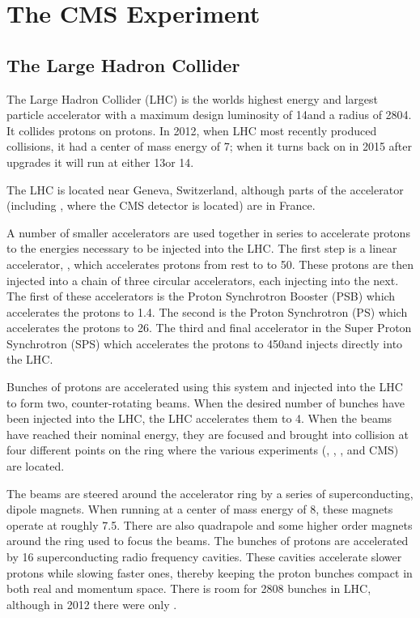 
\chapter{The CMS Experiment}
\label{experiment_chapter}

\section{The Large Hadron Collider}
\label{lhc_section}

The Large Hadron Collider (LHC) is the worlds highest energy and largest
particle accelerator with a maximum design luminosity of 14\TeV and a radius of
2804\meters \cite{bruning2004}. It collides protons on protons. In 2012, when
LHC most recently produced collisions, it had a center of mass energy of 7\TeV;
when it turns back on in 2015 after upgrades it will run at either 13\TeV or
14\TeV.

The LHC is located near Geneva, Switzerland, although parts of the accelerator
(including \pointfive, where the CMS detector is located) are in France.

A number of smaller accelerators are used together in series to accelerate
protons to the energies necessary to be injected into the LHC. The first step
is a linear accelerator, \linactwo, which accelerates protons from rest to to
50\MeV. These protons are then injected into a chain of three circular
accelerators, each injecting into the next. The first of these accelerators is
the Proton Synchrotron Booster (PSB) which accelerates the protons to 1.4\GeV.
The second is the Proton Synchrotron (PS) which accelerates the protons to
26\GeV. The third and final accelerator in the Super Proton Synchrotron (SPS)
which accelerates the protons to 450\GeV and injects directly into the LHC.

Bunches of protons are accelerated using this system and injected into the LHC
to form two, counter-rotating beams. When the desired number of bunches have
been injected into the LHC, the LHC accelerates them to 4\TeV. When the beams
have reached their nominal energy, they are focused and brought into collision
at four different points on the ring where the various experiments (\ALICE,
\ATLAS, \LHCB, and CMS) are located.

The beams are steered around the accelerator ring by a series of
superconducting, dipole magnets. When running at a center of mass energy of
8\TeV, these magnets operate at roughly 7.5\Tesla. There are also quadrapole
and some higher order magnets around the ring used to focus the beams. The
bunches of protons are accelerated by 16 superconducting radio frequency
cavities. These cavities accelerate slower protons while slowing faster ones,
thereby keeping the proton bunches compact in both real and momentum space.
There is room for 2808 bunches in LHC, although in 2012 there were only
.

